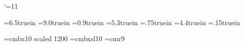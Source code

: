%
%
%
%     
%
% 
%
%

\catcode`\@=11

\newskip\interTAGskip

\newbox\TAGbox          \newbox\INFObox
\newdimen\TAGboxhsize   \newdimen\INFOboxhsize  \newdimen\INFOboxlength
\newdimen\DATEhsize     \newdimen\DATEINFOhsize \newdimen\@datesepamount
\hsize=6.5truein        \vsize=9.0truein        \interTAGskip=12pt
\parindent=0pt          
\TAGboxhsize=0.9truein  \INFOboxhsize=5.3truein %
\DATEhsize=.75truein    \DATEINFOhsize=4.4truein %
\@datesepamount=.15truein                        %
\let\wheretoputit=c     \let\\=\cr
\nopagenumbers

\font\NAMEfont=cmbx10 scaled 1200   \font\TAGfont=cmbxsl10
\font\smallADDRESSfont=cmr9

